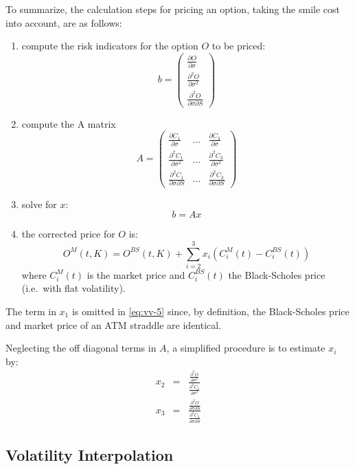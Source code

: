 \documentclass[]{tufte-book}
\begin{document}
To summarize, the calculation steps for pricing an option, taking the
smile cost into account, are as follows:

\begin{enumerate}
\def\labelenumi{\arabic{enumi}.}
\item
  compute the risk indicators for the option \(O\) to be priced:
  \[b =  \begin{pmatrix}
            \frac{\partial O}{\partial \sigma} \\
            \frac{\partial^2 O}{\partial \sigma^2} \\
            \frac{\partial^2 O}{\partial \sigma \partial S}
          \end{pmatrix}\]
\item
  compute the A matrix \[A =
        \begin{pmatrix}
            \frac{\partial C_1}{\partial \sigma} & \ldots & \frac{\partial C_3}{\partial \sigma}\\
            \frac{\partial^2 C_1}{\partial \sigma^2} & \ldots & \frac{\partial^2 C_3}{\partial \sigma^2}  \\
            \frac{\partial^2 C_1}{\partial \sigma \partial S}
   & \ldots & \frac{\partial^2 C_3}{\partial \sigma \partial S}
  \end{pmatrix}\]
\item
  solve for \(x\): \[b = Ax\]
\item
  the corrected price for \(O\) is:
  \[O^M(t,K) = O^{BS}(t,K) + \sum_{i=2}^3 x_i \left( C_i^M(t) - C_i^{BS}(t) \right)
          \label{eq:vv-5}\]
  where \(C^M_i(t)\) is the market price and
  \(C^{BS}_i(t)\) the Black-Scholes price (i.e.~with flat volatility).
\end{enumerate}

The term in \(x_1\) is omitted in \eqref{eq:vv-5} since, by definition,
the Black-Scholes price and market price of an ATM straddle are
identical.

Neglecting the off diagonal terms in \(A\), a simplified procedure is to
estimate \(x_i\) by:
\begin{align}
  x_2 &=& \frac{\frac{\partial^2 O}{\partial \sigma^2}}{\frac{\partial^2 C_2}{\partial \sigma^2}} \\
  x_3 &=&  \frac{\frac{\partial^2 O}{\partial \sigma \partial S}}{\frac{\partial^2 C_3}{\partial \sigma \partial S}}
\end{align}

\hypertarget{volatility-interpolation}{%
\subsection{Volatility Interpolation}\label{volatility-interpolation}}
\end{document}
